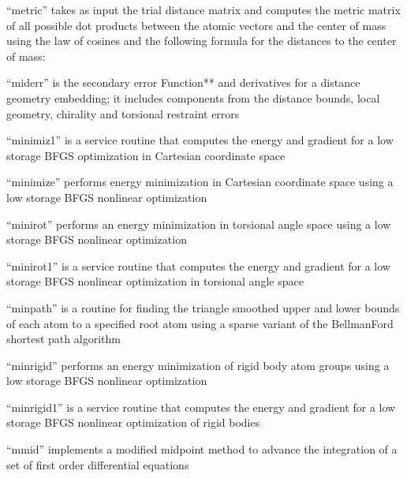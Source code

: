 \documentclass[letterpaper,11pt,english]{sphinxmanual}
\begin{document}

“metric” takes as input the trial distance matrix and computes the metric matrix of all possible dot products between the atomic vectors and the center of mass using the law of cosines and the following formula for the distances to the center of mass:


“miderr” is the secondary error Function** and derivatives for a distance geometry embedding; it includes components from the distance bounds, local geometry, chirality and torsional restraint errors


“minimiz1” is a service routine that computes the energy and gradient for a low storage BFGS optimization in Cartesian coordinate space


“minimize” performs energy minimization in Cartesian coordinate space using a low storage BFGS nonlinear optimization


“minirot” performs an energy minimization in torsional angle space using a low storage BFGS nonlinear optimization


“minirot1” is a service routine that computes the energy and gradient for a low storage BFGS nonlinear optimization in torsional angle space


“minpath” is a routine for finding the triangle smoothed upper and lower bounds of each atom to a specified root atom using a sparse variant of the Bellman\sphinxhyphen{}Ford shortest path algorithm


“minrigid” performs an energy minimization of rigid body atom groups using a low storage BFGS nonlinear optimization


“minrigid1” is a service routine that computes the energy and gradient for a low storage BFGS nonlinear optimization of rigid bodies


“mmid” implements a modified midpoint method to advance the integration of a set of first order differential equations
\end{document}

